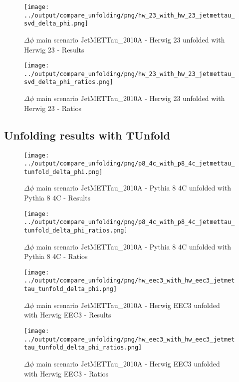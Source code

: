 \documentclass[11pt]{book}
\begin{document}
\begin{figure}[ht]
\centering
\texttt{[image: ../output/compare\_unfolding/png/hw\_23\_with\_hw\_23\_jetmettau\_svd\_delta\_phi.png]}
\caption{$\Delta\phi$ main scenario JetMETTau\_2010A - Herwig 23 unfolded with Herwig 23 - Results}
\label{hw_23_hw_23_jetmettau_svd_delta_phi_a}
\end{figure}

\begin{figure}[ht]
\centering
\texttt{[image: ../output/compare\_unfolding/png/hw\_23\_with\_hw\_23\_jetmettau\_svd\_delta\_phi\_ratios.png]}
\caption{$\Delta\phi$ main scenario JetMETTau\_2010A - Herwig 23 unfolded with Herwig 23 - Ratios}
\label{hw_23_jetmettau_svd_delta_phi_b}
\end{figure}


\clearpage
\subsection{Unfolding results with TUnfold}

\begin{figure}[ht]
\centering
\texttt{[image: ../output/compare\_unfolding/png/p8\_4c\_with\_p8\_4c\_jetmettau\_tunfold\_delta\_phi.png]}
\caption{$\Delta\phi$ main scenario JetMETTau\_2010A - Pythia 8 4C unfolded with Pythia 8 4C - Results}
\label{p8_p8_jetmettau_tunfold_delta_phi_a}
\end{figure}

\begin{figure}[ht]
\centering
\texttt{[image: ../output/compare\_unfolding/png/p8\_4c\_with\_p8\_4c\_jetmettau\_tunfold\_delta\_phi\_ratios.png]}
\caption{$\Delta\phi$ main scenario JetMETTau\_2010A - Pythia 8 4C unfolded with Pythia 8 4C - Ratios}
\label{p8_p8_jetmettau_tunfold_delta_phi_b}
\end{figure}

\begin{figure}[ht]
\centering
\texttt{[image: ../output/compare\_unfolding/png/hw\_eec3\_with\_hw\_eec3\_jetmettau\_tunfold\_delta\_phi.png]}
\caption{$\Delta\phi$ main scenario JetMETTau\_2010A - Herwig EEC3 unfolded with Herwig EEC3 - Results}
\label{hw_eec3_hw_eec3_jetmettau_tunfold_delta_phi_a}
\end{figure}

\begin{figure}[ht]
\centering
\texttt{[image: ../output/compare\_unfolding/png/hw\_eec3\_with\_hw\_eec3\_jetmettau\_tunfold\_delta\_phi\_ratios.png]}
\caption{$\Delta\phi$ main scenario JetMETTau\_2010A - Herwig EEC3 unfolded with Herwig EEC3 - Ratios}
\label{hw_eec3_jetmettau_tunfold_delta_phi_b}
\end{figure}
\end{document}

